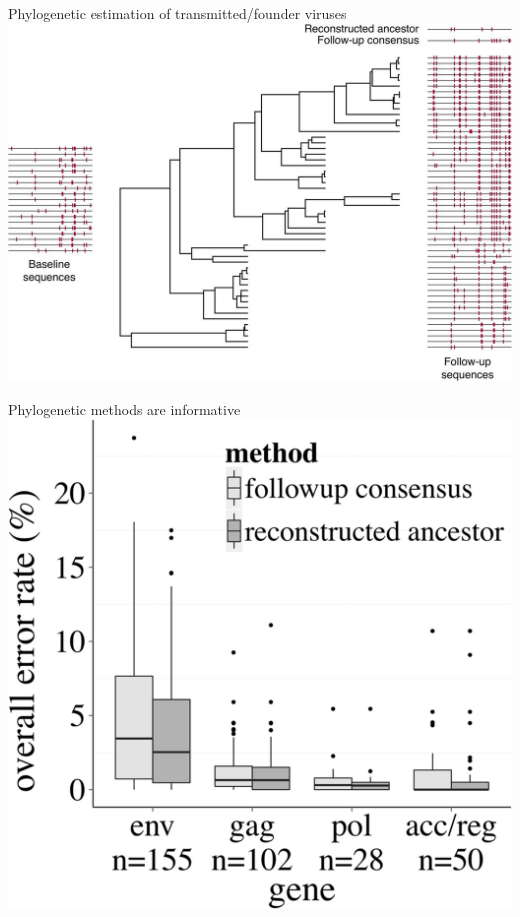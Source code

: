 \documentclass{beamer}
\begin{document}
\begin{frame}{Phylogenetic estimation of transmitted/founder viruses}
    \includegraphics[width=\textwidth]{mccloskey2014evaluation_f1}
\end{frame}

\begin{frame}{Phylogenetic methods are informative}
    \includegraphics[height=\textheight]{mccloskey2014evaluation_f2}
\end{frame}
\end{document}
